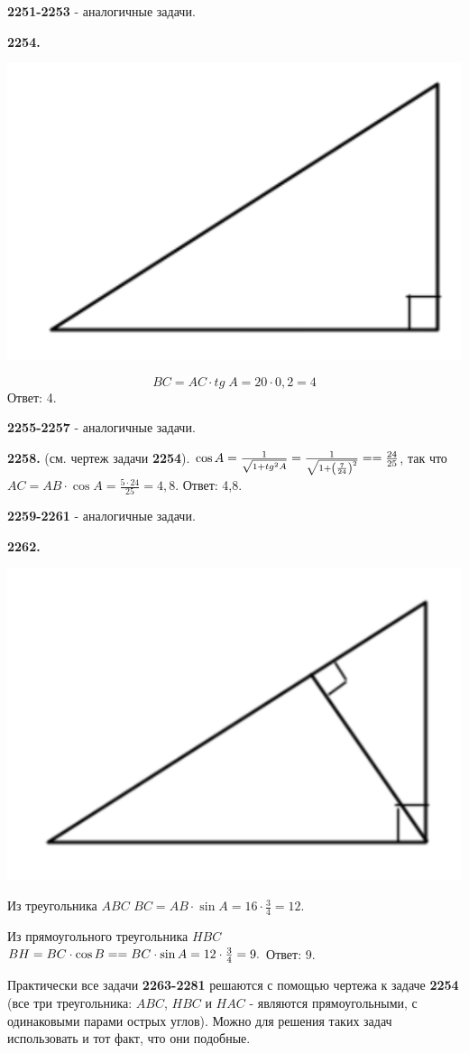 \textbf{2251-2253} - аналогичные задачи.

\textbf{2254.} 
 
{\centering \includegraphics[width=0.4\linewidth]{Geometry/Content/51.png}
	
}
\[
BC = AC\cdot tg\;A =20\cdot 0,2=4
\] \null \hspace*{\fill} Ответ: 4.

\textbf{2255-2257} - аналогичные задачи.

\textbf{2258.} (см. чертеж задачи \textbf{2254}). $\cos{A}=\frac{1}{\sqrt{1+tg^2A}}=\frac{1}{\sqrt{1 + \left( \frac{7}{24} \right)^2}} = \linebreak= \frac{24}{25}$,  
так что $AC=AB\cdot\cos{A}=\frac{5\cdot24}{25}=4,8.$ \newline \null \hspace*{\fill} Ответ: 4,8.

\textbf{2259-2261} - аналогичные задачи.

\textbf{2262.}

{\centering \includegraphics[width=0.4\linewidth]{Geometry/Content/52.png}
	
}

Из треугольника $ABC$ $BC=AB\cdot\sin{A}=16\cdot\frac{3}{4}=12$.

Из прямоугольного треугольника $HBC$ $BH=BC\cdot\cos{B}=\linebreak=BC\cdot\sin{A}=12\cdot\frac{3}{4}=9.$ \newline \null \hspace*{\fill} Ответ: 9.

Практически все задачи \textbf{2263-2281} решаются с помощью чертежа к задаче \textbf{2254} (все три треугольника: $ABC$, $HBC$ и $HAC$ - являются прямоугольными, с одинаковыми парами острых углов). Можно для решения таких задач использовать и тот факт, что они подобные. 

